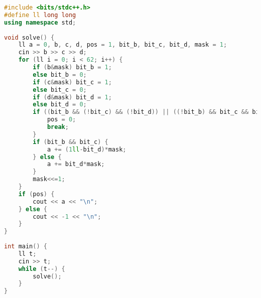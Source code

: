\documentclass[11pt]{article}
\begin{document}
\begin{lstlisting}[language=C++]
#include <bits/stdc++.h>
#define ll long long
using namespace std;
 
void solve() {
    ll a = 0, b, c, d, pos = 1, bit_b, bit_c, bit_d, mask = 1;
    cin >> b >> c >> d;
    for (ll i = 0; i < 62; i++) {
        if (b&mask) bit_b = 1;
        else bit_b = 0;
        if (c&mask) bit_c = 1;
        else bit_c = 0;
        if (d&mask) bit_d = 1;
        else bit_d = 0;
        if ((bit_b && (!bit_c) && (!bit_d)) || ((!bit_b) && bit_c && bit_d)) {
            pos = 0;
            break;
        }
        if (bit_b && bit_c) {
            a += (1ll-bit_d)*mask;
        } else {
            a += bit_d*mask;
        }
        mask<<=1;
    }
    if (pos) {
        cout << a << "\n";
    } else {
        cout << -1 << "\n";
    }
}
 
int main() {
    ll t;
    cin >> t;
    while (t--) {
        solve();
    }
}
\end{lstlisting}
\end{document}
